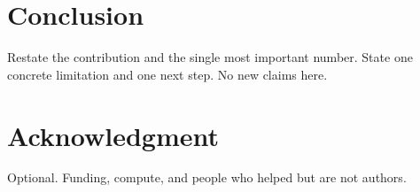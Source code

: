 \documentclass[conference]{IEEEtran}
\begin{document}
\section{Conclusion}
Restate the contribution and the single most important number. State one concrete
limitation and one next step. No new claims here.

\section*{Acknowledgment}
Optional. Funding, compute, and people who helped but are not authors.



\end{document}
